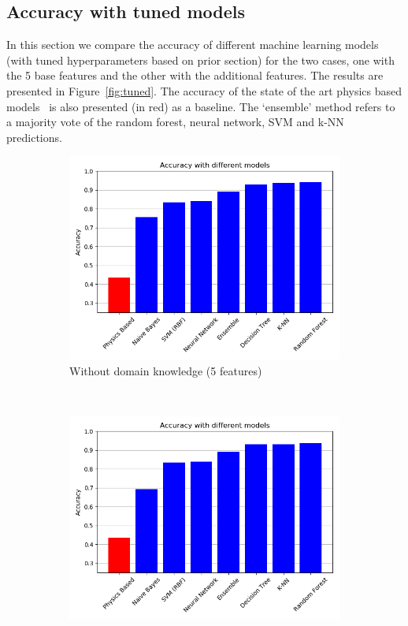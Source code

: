 \documentclass{article}
\begin{document}
\subsection{Accuracy with tuned models}
In this section we compare the accuracy of different machine learning models (with tuned hyperparameters based on prior section) for the two cases,  one with the 5 base features and the other with the additional features. The results are presented in Figure~\ref{fig:tuned}. The accuracy of the state of the art physics based models~\cite{agarwal2019computational} is also presented (in red) as a baseline. The `ensemble' method refers to a majority vote of the random forest, neural network, SVM and k-NN predictions. 

\begin{figure}[h!]
    \centering
    \begin{subfigure}[b]{0.45\textwidth}
        \includegraphics[width=\textwidth]{figures/wo_domain_knowledge/accuracy_compilation.png}
        \caption{Without domain knowledge (5  features)}
        \label{fig:gull}
    \end{subfigure}
    ~ %
    \begin{subfigure}[b]{0.45\textwidth}
        \includegraphics[width=\textwidth]{figures/w_domain_knowledge/accuracy_compilation.png}

\end{subfigure}
\end{figure}
\end{document}
